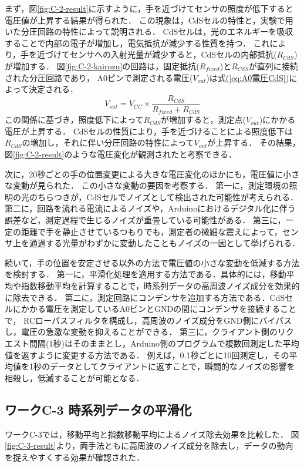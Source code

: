 まず，図\ref{fig:C-2-result}に示すように，手を近づけてセンサの照度が低下すると電圧値が上昇する結果が得られた．
この現象は，CdSセルの特性と，実験で用いた分圧回路の特性によって説明される．
CdSセルは，光のエネルギーを吸収することで内部の電子が増加し，電気抵抗が減少する性質を持つ\cite{workC_CdSセル}．
これにより，手を近づけてセンサへの入射光量が減少すると，CdSセルの内部抵抗($R_{CdS}$)が増加する．
図\ref{fig:C-2-kairozu}の回路は，固定抵抗($R_{fixed}$)と$R_{CdS}$が直列に接続された分圧回路であり，
A0ピンで測定される電圧($V_{out}$)は式(\ref{eq:A0電圧CdS})によって決定される\cite{workC_分圧回路}．
\begin{equation}
  V_{out} = V_{CC} \times \frac{R_{CdS}}{R_{fixed} + R_{CdS}} \label{eq:A0電圧CdS}
\end{equation}
この関係に基づき，照度低下によって$R_{CdS}$が増加すると，測定点($V_{out}$)にかかる電圧が上昇する．
CdSセルの性質により，手を近づけることによる照度低下は$R_{CdS}$の増加し，それに伴い分圧回路の特性によって$V_{out}$が上昇する．
その結果，図\ref{fig:C-2-result}のような電圧変化が観測されたと考察できる．

次に，20秒ごとの手の位置変更による大きな電圧変化のほかにも，電圧値に小さな変動が見られた．
この小さな変動の要因を考察する．
第一に，測定環境の照明の光のちらつきが，CdSセルでノイズとして検出された可能性が考えられる．
第二に，回路を流れる電流によるノイズや，Arduinoにおけるデジタル化に伴う誤差など，測定過程で生じるノイズが重畳している可能性がある．
第三に，一定の距離で手を静止させているつもりでも，測定者の微細な震えによって，センサ上を通過する光量がわずかに変動したこともノイズの一因として挙げられる．

続いて，手の位置を安定させる以外の方法で電圧値の小さな変動を低減する方法を検討する．
第一に，平滑化処理を適用する方法である．具体的には，移動平均や指数移動平均を計算することで，時系列データの高周波ノイズ成分を効果的に除去できる．
第二に，測定回路にコンデンサを追加する方法である．CdSセルにかかる電圧を測定しているA0ピンとGNDの間にコンデンサを接続することで，
RCローパスフィルタを構成し，高周波のノイズ成分をGND側にバイパスし，電圧の急激な変動を抑えることができる．
第三に，クライアント側のリクエスト間隔(1秒)はそのままとし，Arduino側のプログラムで複数回測定した平均値を返すように変更する方法である．
例えば，0.1秒ごとに10回測定し，その平均値を1秒のデータとしてクライアントに返すことで，瞬間的なノイズの影響を相殺し，低減することが可能となる．



\subsection{ワークC-3 時系列データの平滑化}
ワークC-3では，移動平均と指数移動平均によるノイズ除去効果を比較した．
図\ref{fig:C-3-result}より，両手法ともに高周波のノイズ成分を除去し，データの動向を捉えやすくする効果が確認された．

